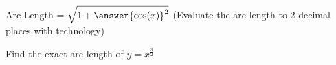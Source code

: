 \documentclass{ximera}
\begin{document}
\begin{problem}

Arc Length = $\sqrt{1+{\answer{\cos(x)}^2}}$ (Evaluate the arc length to 2 decimal places with technology)

Find the exact arc length of $y = x^{\frac{3}{2}}$ 

\end{problem}
\end{document}
